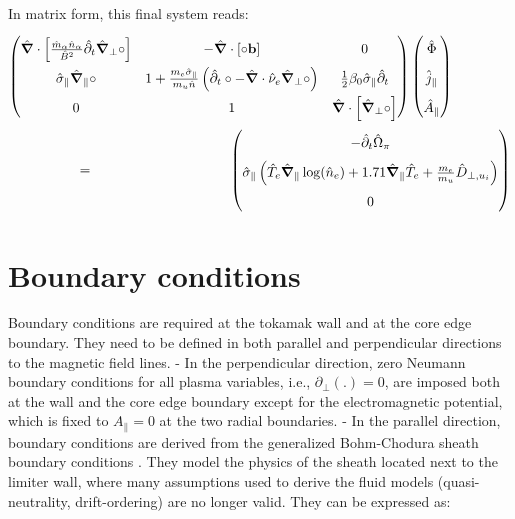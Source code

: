 In matrix form, this final system reads:
\begin{align}
\renewcommand\arraystretch{1.8}
\begin{pmatrix}
\hat{\grad}\cdot\left[\frac{\hat{m}_\alpha \hat{n}_\alpha}{ \hat{B}^2}\hat{\partial}_t\hat{\grad}_\perp\circ\right]  & 
-\hat{\grad}\cdot\left[\circ\mathbf{b}\right] & 
0 \\
\hat{\sigma}_\parallel\hat{\grad}_\parallel\circ &
1 + \frac{m_e\hat{\sigma}_\parallel}{m_u\hat{n}}\left(\hat{\partial}_t\circ - \hat{\grad}\cdot\hat{\nu}_e\hat{\grad}_\perp\circ\right) &
\frac{1}{2}\beta_0\hat{\sigma}_\parallel\hat{\partial}_t \\
0 & 1 & \hat{\grad}\cdot\left[\hat{\grad}_\perp\circ\right]
\end{pmatrix}
\begin{pmatrix}
\hat{\Phi} \\ \hat{j}_\parallel \\ \hat{A}_\parallel
\end{pmatrix}  \hspace{1.5cm}\nonumber\\ = \hspace{3.5cm}
\begin{pmatrix}
-\hat{\partial}_t \hat{\Omega}_\pi \\
\hat{\sigma}_\parallel\left(\hat{T}_e\hat{\grad}_\parallel\log(\hat{n}_e) + 1.71\hat{\grad}_\parallel \hat{T}_e + \frac{m_e}{m_u}\hat{D}_{\perp,u_i}\right) \\
0
\end{pmatrix} \label{eq:vorticityEquation_ElectronInertiaElectromagnetism_dedimensionalized}
\end{align} 





\section{Boundary conditions}
\label{sec:S3X_boundaryConditions}

Boundary conditions are required at the tokamak wall and at the core edge boundary. They need to be defined in both parallel and perpendicular directions to the magnetic field lines. \newline
- In the perpendicular direction, zero Neumann boundary conditions for all plasma variables, i.e., $\partial_{\perp} (.)=0$, are imposed both at the wall and the core edge boundary except for the electromagnetic potential, which is fixed to $A_\parallel=0$ at the two radial boundaries. \newline
- In the parallel direction, boundary conditions are derived from the generalized Bohm-Chodura sheath boundary conditions \cite{Stangeby_2000}. They model the physics of the sheath located next to the limiter wall, where many assumptions used to derive the fluid models (quasi-neutrality, drift-ordering) are no longer valid. They can be expressed as: \newline

